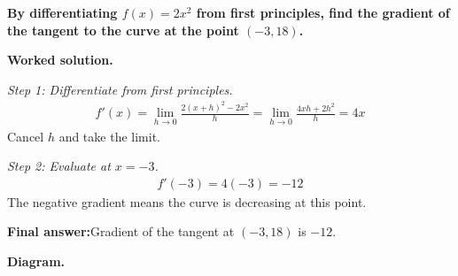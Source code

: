 \documentclass[11pt]{article}
\newcommand{\question}[1]{\par\medskip\noindent\textbf{#1}\par}
\begin{document}
\question{By differentiating \( f(x) = 2x^2 \) from first principles, find the gradient of the tangent to the curve at the point \( (-3, 18) \).}

\textbf{Worked solution.}

\textit{Step 1: Differentiate from first principles.}
\[\begin{gathered}
f'(x) = \lim_{h \to 0} \frac{2(x+h)^2 - 2x^2}{h} = \lim_{h \to 0} \frac{4xh + 2h^2}{h} = 4x
\end{gathered}\]
Cancel \( h \) and take the limit.

\textit{Step 2: Evaluate at \( x = -3 \).}
\[\begin{gathered}
f'(-3) = 4(-3) = -12
\end{gathered}\]
The negative gradient means the curve is decreasing at this point.

\begin{answerbox}
\textbf{Final answer:}\quad Gradient of the tangent at \(\displaystyle  (-3, 18) \) is \(\displaystyle  -12 \).
\end{answerbox}
\textbf{Diagram.}
\end{document}
